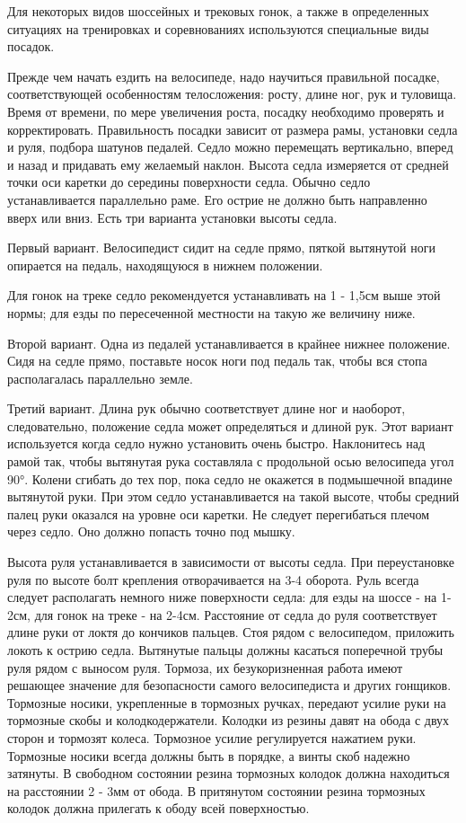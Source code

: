 \documentclass[a4paper,14pt]{extreport}
\begin{document}
Для некоторых видов шоссейных и трековых гонок, а также в определенных ситуациях на тренировках и соревнованиях используются специальные виды посадок.

Прежде чем начать ездить на велосипеде, надо научиться правильной посадке, соответствующей особенностям телосложения: росту, длине ног, рук и туловища. Время от времени, по мере увеличения роста, посадку необходимо проверять и корректировать. Правильность посадки зависит от размера рамы, установки седла и руля, подбора шатунов педалей.
Седло можно перемещать вертикально, вперед и назад и придавать ему желаемый наклон. Высота седла измеряется от средней точки оси каретки до середины поверхности седла. Обычно седло устанавливается параллельно раме. Его острие не должно быть направленно вверх или вниз. Есть три варианта установки высоты седла.

Первый вариант. Велосипедист сидит на седле прямо, пяткой вытянутой ноги опирается на педаль, находящуюся в нижнем положении.

Для гонок на треке седло рекомендуется устанавливать на 1 - 1,5см выше этой нормы; для езды по пересеченной местности на такую же величину ниже.

Второй вариант. Одна из педалей устанавливается в крайнее нижнее положение. Сидя на седле прямо, поставьте носок ноги под педаль так, чтобы вся стопа располагалась параллельно земле.

Третий вариант. Длина рук обычно соответствует длине ног и наоборот, следовательно, положение седла может определяться и длиной рук. Этот вариант используется когда седло нужно установить очень быстро. Наклонитесь над рамой так, чтобы вытянутая рука составляла с продольной осью велосипеда угол 90°. Колени сгибать до тех пор, пока седло не окажется в подмышечной впадине вытянутой руки. При этом седло устанавливается на такой высоте, чтобы средний палец руки оказался на уровне оси каретки. Не следует перегибаться плечом через седло. Оно должно попасть точно под мышку.

Высота руля устанавливается в зависимости от высоты седла. При переустановке руля по высоте болт крепления отворачивается на 3-4 оборота. Руль всегда следует располагать немного ниже поверхности седла: для езды на шоссе - на 1-2см, для гонок на треке - на 2-4см. Расстояние от седла до руля соответствует длине руки от локтя до кончиков пальцев. Стоя рядом с велосипедом, приложить локоть к острию седла. Вытянутые пальцы должны касаться поперечной трубы руля рядом с выносом руля.
Тормоза, их безукоризненная работа имеют решающее значение для безопасности самого велосипедиста и других гонщиков. Тормозные носики, укрепленные в тормозных ручках, передают усилие руки на тормозные скобы и колодкодержатели. Колодки из резины давят на обода с двух сторон и тормозят колеса. Тормозное усилие регулируется нажатием руки. Тормозные носики всегда должны быть в порядке, а винты скоб надежно затянуты. В свободном состоянии резина тормозных колодок должна находиться на расстоянии 2 - 3мм от обода. В притянутом состоянии резина тормозных колодок должна прилегать к ободу всей поверхностью.
\end{document}
